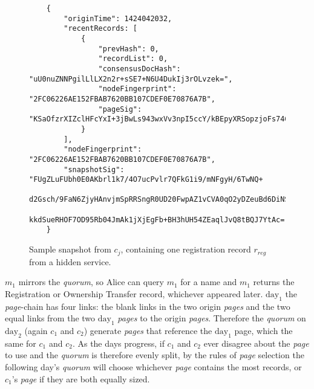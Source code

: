 \begin{figure}
	\begin{lstlisting}
	{
		"originTime": 1424042032,
		"recentRecords: [
			{
				"prevHash": 0,
				"recordList": 0,
				"consensusDocHash": "uU0nuZNNPgilLlLX2n2r+sSE7+N6U4DukIj3rOLvzek=",
				"nodeFingerprint": "2FC06226AE152FBAB7620BB107CDEF0E70876A7B",
				"pageSig": 	"KSaOfzrXIZclHFcYxI+3jBwLs943wxVv3npI5ccY/kBEpyXRSopzjoFs746n0tJqUpdY4Kbe6DBwERaN7ELmSSK9Pu6q8QeKzNAh+QOnKl0fKBN7fqowjkQ3ktFkR0Vuox9WrrbNTMa4+up0Np52hlbKA3zSRz4fbR9NVlh6uuQ="
			}
		],
		"nodeFingerprint": "2FC06226AE152FBAB7620BB107CDEF0E70876A7B",
		"snapshotSig": "FUgZLuFUbh0E0AKbrl1k7/4O7ucPvlr7QFkG1i9/mNFgyH/6TwNQ+
			d2Gsch/9FaN6ZjyHAnvjmSpRRSngR0UD20FwpAZ1vCVA0qO2yDZeuBd6DiNS
			kkdSueRHOF7OD95Rb04JmAk1jXjEgFb+BH3hUH54ZEaqlJvQ8tBQJ7YtAc="
	}
	\end{lstlisting}
	\caption{Sample snapshot from $ c_{j} $, containing one registration record $ r_{reg} $ from a hidden service.}
	\label{fig:sampleSnapshot}
\end{figure}

$ m_{1} $ mirrors the \emph{quorum}, so Alice can query $ m_{1} $ for a name and $ m_{1} $ returns the Registration or Ownership Transfer record, whichever appeared later. $ \textrm{day}_{1} $ the \emph{page}-chain has four links: the blank links in the two origin \emph{pages} and the two equal links from the two $ \textrm{day}_{1} $ \emph{pages} to the origin \emph{pages}. Therefore the \emph{quorum} on $ \textrm{day}_{2} $ (again $ c_{1} $ and $ c_{2} $) generate \emph{pages} that reference the $ \textrm{day}_{1} $ page, which the same for $ c_{1} $ and $ c_{2} $. As the days progress, if $ c_{1} $ and $ c_{2} $ ever disagree about the \emph{page} to use and the \emph{quorum} is therefore evenly split, by the rules of \emph{page} selection the following day's \emph{quorum} will choose whichever \emph{page} contains the most records, or $ c_{1} $'s \emph{page} if they are both equally sized.

